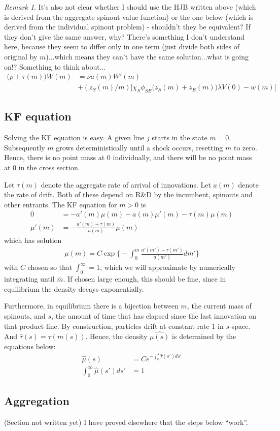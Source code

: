 \documentclass[12pt,english]{article}
\theoremstyle{remark}
\newtheorem*{remark}{Remark}
\begin{document}
\begin{remark}
	It's also not clear whether I should use the HJB written above (which is derived from the aggregate spinout value function) or the one below (which is derived from the individual spinout problem) - shouldn't they be equivalent? If they don't give the same answer, why? There's something I don't understand here, because they seem to differ only in one term (just divide both sides of original by $m$)...which means they can't have the same solution...what is going on!? Something to think about...
	\begin{align*}
		\big(\rho + \tau(m)\big)W(m) &= \nu a(m) W'(m)  \\
									  &+ (z_S(m) / m) \Big[ \chi_S \phi_{SE}\big(z_S(m) + z_E(m)\big) \lambda V(0) - w(m) \Big] 
	\end{align*}
\end{remark}


\subsection{KF equation}

Solving the KF equation is easy. A given line $j$ starts in the state $m = 0$. Subsequently $m$ grows deterministically until a shock occurs, resetting $m$ to zero. Hence, there is no point mass at 0 individually, and there will be no point mass at 0 in the cross section. 

Let $\tau(m)$ denote the aggregate rate of arrival of innovations. Let $a(m)$ denote the rate of drift. Both of these depend on R\&D by the incumbent, spinouts and other entrants. The KF equation for $m > 0$ is 
\begin{align*}
	0 &= -a'(m)\mu(m) - a(m)\mu'(m) - \tau(m)\mu(m) \\
	\mu'(m) &= -\frac{a'(m) + \tau(m)}{a(m)} \mu(m)
\end{align*}
which has solution 
\begin{align*}
	\mu(m) = C\exp \Bigg\{ - \int_0^m \frac{a'(m') + \tau(m')}{a(m')} dm'    \Bigg\}
\end{align*}
with $C$ chosen so that $\int_0^{\infty} = 1$, which we will approximate by numerically integrating until $\bar{m}$. If chosen large enough, this should be fine, since in equilibrium the density decays exponentially. 

Furthermore, in equilibrium there is a bijection between $m$, the current mass of spinouts, and $s$, the amount of time that has elapsed since the last innovation on that product line. By construction, particles drift at constant rate 1 in $s$-space. And $\hat{\tau}(s) = \tau(m(s))$. Hence, the density $\hat{\mu(s)}$ is determined by the equations below:
\begin{align*}
	\hat{\mu}(s) &= Ce^{-\int_0^s \hat{\tau}(s')ds'} \\
	\int_0^{\infty} \hat{\mu}(s') ds' &= 1
\end{align*}

\subsection{Aggregation}

(Section not written yet) I have proved elsewhere that the steps below ``work''. 
\end{document}
